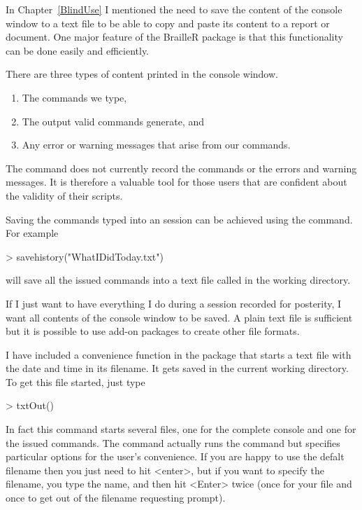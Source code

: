 In Chapter~\ref{BlindUse} I mentioned the need to save the content of the console window to a text file to be able to copy and paste its content to a report or document. One major feature of the BrailleR package is that this functionality can be done easily and efficiently. 
 
There are three types of content printed in the console window.\begin{enumerate} 
\item The commands we type, 
\item The output valid commands generate, and 
\item Any error or warning messages that arise from our commands. 
\end{enumerate} 
 
The  command does not currently record the commands or the errors and warning messages. It is therefore a valuable tool for those \R{} users that are confident about the validity of their scripts. 
 
Saving the commands typed into an \R{} session can be achieved using the  command. For example 
\begin{Schunk}
\begin{Sinput}
> savehistory("WhatIDidToday.txt") 
\end{Sinput}
\end{Schunk}
will save all the issued commands into a text file called  in the working directory.  
 
If I just want to have everything I do during a session recorded for posterity, I want all contents of the console window to be saved. A plain text file is sufficient but it is possible to use add-on packages to create other file formats. 
 
I have included a convenience function in the  package that starts a text file with the date and time in its filename. It gets saved in the current working directory. To get this file started, just type 
\begin{Schunk}
\begin{Sinput}
> txtOut() 
\end{Sinput}
\end{Schunk}
In fact this command starts several files, one for the complete console and one for the issued commands. The command actually runs the  command but specifies particular options for the user's convenience. If you are happy to use the defalt filename then you just need to hit <enter>, but if you want to specify the filename, you type the name, and then hit <Enter> twice (once for your file and once to get out of the filename requesting prompt). 
 
